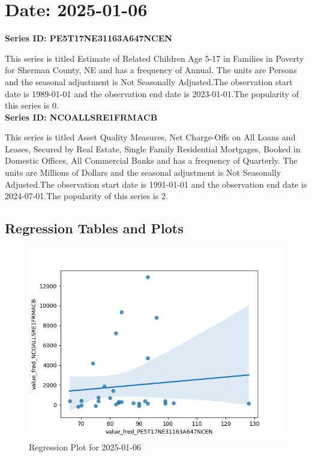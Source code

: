 \section{Date: 2025-01-06}
\noindent \textbf{Series ID: PE5T17NE31163A647NCEN} 

\noindent This series is titled Estimate of Related Children Age 5-17 in Families in Poverty for Sherman County, NE and has a frequency of Annual. The units are Persons and the seasonal adjustment is Not Seasonally Adjusted.The observation start date is 1989-01-01 and the observation end date is 2023-01-01.The popularity of this series is 0. \\ 

\noindent \textbf{Series ID: NCOALLSRE1FRMACB} 

\noindent This series is titled Asset Quality Measures, Net Charge-Offs on All Loans and Leases, Secured by Real Estate, Single Family Residential Mortgages, Booked in Domestic Offices, All Commercial Banks and has a frequency of Quarterly. The units are Millions of Dollars and the seasonal adjustment is Not Seasonally Adjusted.The observation start date is 1991-01-01 and the observation end date is 2024-07-01.The popularity of this series is 2. \\ 

\subsection{Regression Tables and Plots}


\begin{figure}
\centering
\includegraphics[scale = 0.9]{plots/plot_2025-01-06.png}
\caption{Regression Plot for 2025-01-06}
\end{figure}
\newpage
